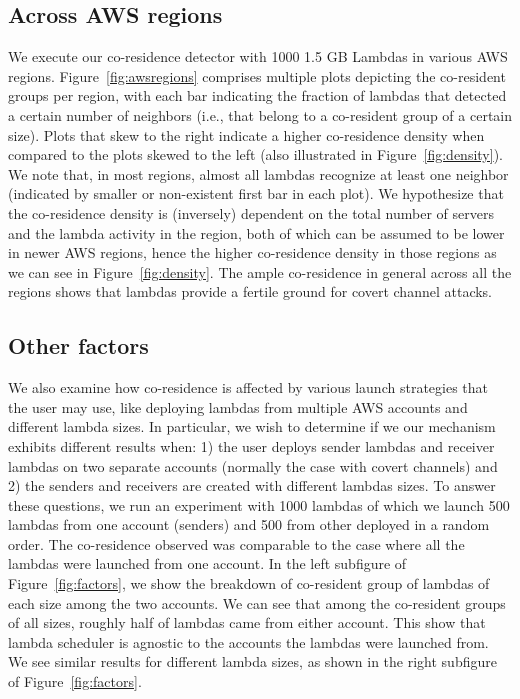 \subsection{Across AWS regions}
We execute our co-residence detector with 1000 1.5 GB Lambdas in various AWS
regions. Figure~\ref{fig:awsregions} comprises multiple plots depicting
the co-resident groups per region, with each bar indicating the fraction of
lambdas that detected a certain number of neighbors (i.e., that belong to a
co-resident group of a certain size). Plots that skew to the right indicate a
higher co-residence density when compared to the plots skewed to the left (also
illustrated in Figure~\ref{fig:density}). We note that, in most regions, almost
all lambdas recognize at least one neighbor (indicated by smaller or
non-existent first bar in each plot). We hypothesize that the co-residence
density is (inversely) dependent on the total number of servers and the lambda
activity in the region, both of which can be assumed to be lower in newer AWS
regions, hence the higher co-residence density in those regions as we can see in
Figure~\ref{fig:density}. The ample co-residence in general across all the
regions shows that lambdas provide a fertile ground for covert channel attacks.


\subsection{Other factors}
We also examine how co-residence is affected by various launch strategies that
the user may use, like deploying lambdas from multiple AWS accounts and
different lambda sizes. In particular, we wish to determine if we our mechanism
exhibits different results when: 1) the user deploys sender lambdas and receiver
lambdas on two separate accounts (normally the case with covert channels) and 2)
the senders and receivers are created with different lambdas sizes.  To answer
these questions, we run an experiment with 1000 lambdas of which we launch 500
lambdas from one account (senders) and 500 from other deployed in a random
order. The co-residence observed was comparable to the case where all the
lambdas were launched from one account. In the left subfigure of
Figure~\ref{fig:factors}, we show the breakdown of co-resident group of lambdas
of each size among the two accounts.  We can see that among the co-resident
groups of all sizes, roughly half of lambdas came from either account. This show
that lambda scheduler is agnostic to the accounts the lambdas were launched
from. We see similar results for different lambda sizes, as shown in the right
subfigure of Figure~\ref{fig:factors}.

